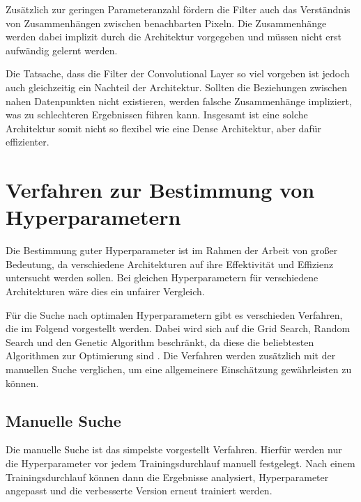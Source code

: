 Zusätzlich zur geringen Parameteranzahl fördern die Filter auch das Verständnis von Zusammenhängen zwischen benachbarten Pixeln.
Die Zusammenhänge werden dabei implizit durch die Architektur vorgegeben und müssen nicht erst aufwändig gelernt werden.
\newline

Die Tatsache, dass die Filter der Convolutional Layer so viel vorgeben ist jedoch auch gleichzeitig ein Nachteil der Architektur.
Sollten die Beziehungen zwischen nahen Datenpunkten nicht existieren, werden falsche Zusammenhänge impliziert, was zu schlechteren Ergebnissen führen kann.
Insgesamt ist eine solche Architektur somit nicht so flexibel wie eine Dense Architektur, aber dafür effizienter.

\section{Verfahren zur Bestimmung von Hyperparametern}
\label{chapter:verfahren-bestimmung-hyperparameter}

Die Bestimmung guter Hyperparameter ist im Rahmen der Arbeit von großer Bedeutung, da verschiedene Architekturen auf ihre Effektivität und Effizienz untersucht werden sollen.
Bei gleichen Hyperparametern für verschiedene Architekturen wäre dies ein unfairer Vergleich.

Für die Suche nach optimalen Hyperparametern gibt es verschieden Verfahren, die im Folgend vorgestellt werden.
Dabei wird sich auf die Grid Search, Random Search und den Genetic Algorithm beschränkt, da diese die beliebtesten Algorithmen zur Optimierung sind \cite{hyperparameters-search-comparison-focus-genetic}.
Die Verfahren werden zusätzlich mit der manuellen Suche verglichen, um eine allgemeinere Einschätzung gewährleisten zu können.

\subsection{Manuelle Suche}
Die manuelle Suche ist das simpelste vorgestellt Verfahren.
Hierfür werden nur die Hyperparameter vor jedem Trainingsdurchlauf manuell festgelegt.
Nach einem Trainingsdurchlauf können dann die Ergebnisse analysiert, Hyperparameter angepasst und die verbesserte Version erneut trainiert werden.


